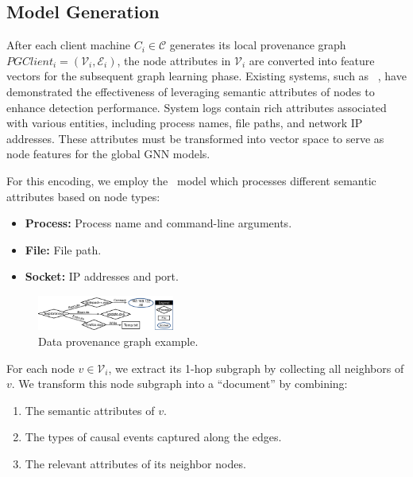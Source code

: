 \subsection{\wordvec Model Generation}
\label{sub:word2vec:model}

After each client machine \(C_i\in \mathcal{C}\) generates its local provenance graph \(PGClient_{i} = (\mathcal{V}_i, \mathcal{E}_i)\), the node attributes in \(\mathcal{V}_i\) are converted into feature vectors for the subsequent graph learning phase. Existing systems, such as \flash~\cite{flash2024}, have demonstrated the effectiveness of leveraging semantic attributes of nodes to enhance detection performance. System logs contain rich attributes associated with various entities, including process names, file paths, and network IP addresses. These attributes must be transformed into vector space to serve as node features for the global GNN models.

For this encoding, we employ the \wordvec~model which processes different semantic attributes based on node types:
\begin{itemize}[itemsep=0.1em, parsep=0em, topsep=0em, leftmargin=*]
    \item \textbf{Process:} Process name and command-line arguments.
    \item \textbf{File:} File path.
    \item \textbf{Socket:} IP addresses and port.
\end{itemize}

\begin{figure}[t!]
    \centering
    \includegraphics[width=0.4\textwidth]{fig/provexp.pdf}
    \caption{Data provenance graph example.}
    \label{provexp}
    \vspace{-3ex}
  \end{figure}
  

For each node \(v \in \mathcal{V}_i\), we extract its 1-hop subgraph by collecting all neighbors of \(v\). We transform this node subgraph into a ``document'' by combining:
\begin{enumerate}[itemsep=0.1em, parsep=0em, topsep=0em, leftmargin=*]
    \item The semantic attributes of \(v\).
    \item The types of causal events captured along the edges.
    \item The relevant attributes of its neighbor nodes.
\end{enumerate}


